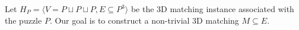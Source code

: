 \documentclass[11pt]{article}
\begin{document}
Let $H_P = \langle V = P \sqcup P \sqcup P, E \subseteq P^3 \rangle$ be the 3D matching instance
associated with the puzzle $P$.  Our goal is to construct a
non-trivial 3D matching $M \subseteq E$.
\end{document}
